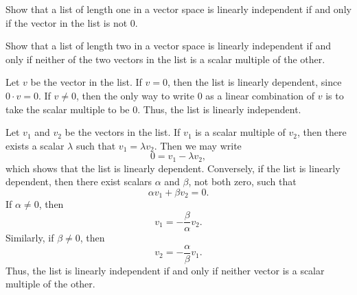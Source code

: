 \begin{exercise}\leavevmode
\begin{parts}
\item Show that a list of length one in a vector space is linearly independent
  if and only if the vector in the list is not $0$.
\item Show that a list of length two in a vector space is linearly independent
  if and only if neither of the two vectors in the list is a scalar multiple of
  the other.
\end{parts}
\end{exercise}
\begin{solution}\leavevmode
\begin{parts}
\item Let $v$ be the vector in the list. If $v=0$, then the list is linearly
  dependent, since $0\cdot v=0$. If $v\ne0$, then the only way to write $0$ as
  a linear combination of $v$ is to take the scalar multiple to be $0$. Thus,
  the list is linearly independent.
\item Let $v_1$ and $v_2$ be the vectors in the list. If $v_1$ is a scalar
  multiple of $v_2$, then there exists a scalar $\lambda$ such that
  $v_1=\lambda v_2$. Then we may write
  \[ 0 = v_1-\lambda v_2, \]
  which shows that the list is linearly dependent. Conversely, if the list is
  linearly dependent, then there exist scalars $\alpha$ and $\beta$, not both
  zero, such that
  \[ \alpha v_1+\beta v_2 = 0. \]
  If $\alpha\ne0$, then
  \[ v_1 = -\frac{\beta}{\alpha}v_2. \]
  Similarly, if $\beta\ne0$, then
  \[ v_2 = -\frac{\alpha}{\beta}v_1. \]
  Thus, the list is linearly independent if and only if neither vector is a
  scalar multiple of the other.
\end{parts}
\end{solution}

